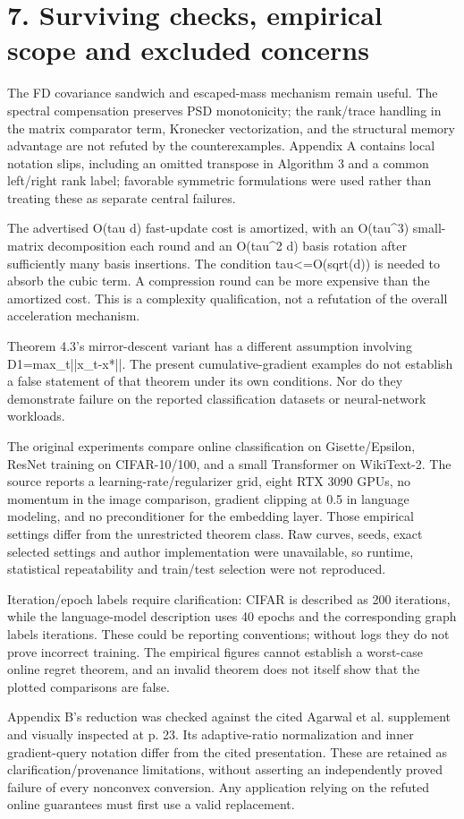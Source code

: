 \documentclass[10pt]{article}
\begin{document}
\section*{7. Surviving checks, empirical scope and excluded concerns}
The FD covariance sandwich and escaped-mass mechanism remain useful. The spectral compensation preserves PSD monotonicity; the rank/trace handling in the matrix comparator term, Kronecker vectorization, and the structural memory advantage are not refuted by the counterexamples. Appendix A contains local notation slips, including an omitted transpose in Algorithm 3 and a common left/right rank label; favorable symmetric formulations were used rather than treating these as separate central failures.\par
The advertised O(tau d) fast-update cost is amortized, with an O(tau\textasciicircum{}3) small-matrix decomposition each round and an O(tau\textasciicircum{}2 d) basis rotation after sufficiently many basis insertions. The condition tau<=O(sqrt(d)) is needed to absorb the cubic term. A compression round can be more expensive than the amortized cost. This is a complexity qualification, not a refutation of the overall acceleration mechanism.\par
Theorem 4.3’s mirror-descent variant has a different assumption involving D1=max\_t||x\_t-x*||. The present cumulative-gradient examples do not establish a false statement of that theorem under its own conditions. Nor do they demonstrate failure on the reported classification datasets or neural-network workloads.\par
The original experiments compare online classification on Gisette/Epsilon, ResNet training on CIFAR-10/100, and a small Transformer on WikiText-2. The source reports a learning-rate/regularizer grid, eight RTX 3090 GPUs, no momentum in the image comparison, gradient clipping at 0.5 in language modeling, and no preconditioner for the embedding layer. Those empirical settings differ from the unrestricted theorem class. Raw curves, seeds, exact selected settings and author implementation were unavailable, so runtime, statistical repeatability and train/test selection were not reproduced.\par
Iteration/epoch labels require clarification: CIFAR is described as 200 iterations, while the language-model description uses 40 epochs and the corresponding graph labels iterations. These could be reporting conventions; without logs they do not prove incorrect training. The empirical figures cannot establish a worst-case online regret theorem, and an invalid theorem does not itself show that the plotted comparisons are false.\par
Appendix B’s reduction was checked against the cited Agarwal et al. supplement and visually inspected at p. 23. Its adaptive-ratio normalization and inner gradient-query notation differ from the cited presentation. These are retained as clarification/provenance limitations, without asserting an independently proved failure of every nonconvex conversion. Any application relying on the refuted online guarantees must first use a valid replacement.\par
\end{document}
